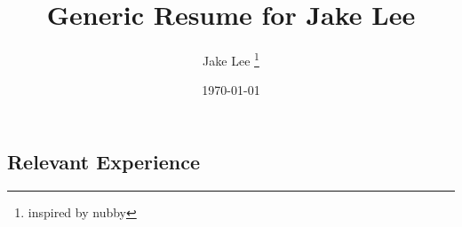 \documentclass[12pt, letterpaper]{article}
\title{Generic Resume for Jake Lee}
\author{Jake Lee \thanks{inspired by nubby}}
\date{\today}
\begin{document}
  \begin{multicols}{2}
    \section*{Relevant Experience}
    \columnbreak

    \begin{flushright}
      \noindent
      \setlength{\fboxsep}{1cm}
    \end{flushright}

  \end{multicols}
  
\end{document}
